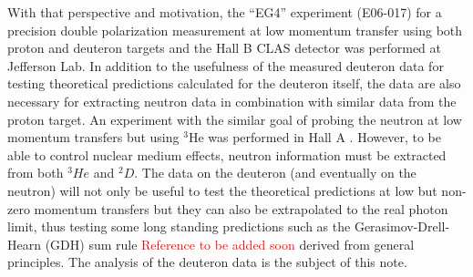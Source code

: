 
With that perspective and motivation, the ``EG4'' experiment (E06-017) %
for a precision double polarization measurement at low momentum transfer %
  using both proton and deuteron targets and the Hall B CLAS detector was performed at Jefferson Lab. 
In addition to the usefulness of the measured %
deuteron data for testing %
theoretical predictions calculated for the deuteron itself, the data %
are also necessary for extracting neutron data%
 in combination with %
similar data from the proton target. %
An experiment with the similar %
goal of probing the neutron at low momentum transfers but using $^3$He was performed in Hall A \cite{propE97_110}. %
However, to be able to control nuclear medium effects, neutron information must be extracted from both $^3He$ and $^2D$.
The data on the deuteron (and eventually on the neutron) will not only be useful to test the theoretical predictions at low but non-zero %
momentum transfers but they can also be %
extrapolated to the %
real photon %
limit, thus %
testing some long standing predictions such as the Gerasimov-Drell-Hearn (GDH) sum rule \textcolor{red}{Reference to be added soon} %
derived from general principles.
The analysis of the deuteron data is the subject of this note. %

